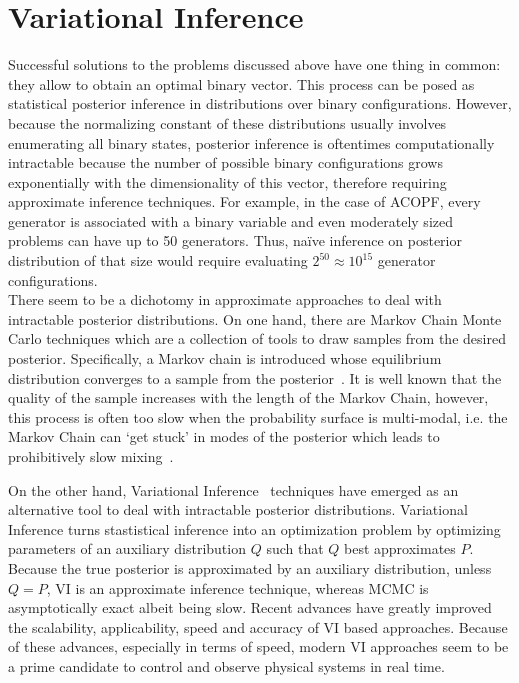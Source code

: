 \documentclass[11pt]{cmuthesis} %
\begin{document}
\chapter{Variational Inference}
Successful solutions to the problems discussed above have one thing in common: they allow to obtain an optimal binary vector. This process can be posed as statistical posterior inference in distributions over binary configurations. However, because the normalizing constant of these distributions usually involves enumerating all binary states, posterior inference is oftentimes computationally intractable because the number of possible binary configurations grows exponentially with the dimensionality of this vector, therefore requiring approximate inference techniques. For example, in the case of ACOPF, every generator is associated with a binary variable and even moderately sized problems can have up to 50 generators. Thus, na\"ive inference on posterior distribution of that size would require evaluating $2^{50} \approx 10^{15}$ generator configurations.\\
There seem to be a dichotomy in approximate approaches to deal with intractable posterior distributions. On one hand, there are Markov Chain Monte Carlo techniques which are a collection of tools to draw samples from the desired posterior. Specifically, a Markov chain is introduced whose equilibrium distribution converges to a sample from the posterior~\cite{geman1987stochastic}. It is well known that the quality of the sample increases with the length of the Markov Chain, however, this process is often too slow when the probability surface is multi-modal, i.e. the Markov Chain can `get stuck' in modes of the posterior which leads to prohibitively slow mixing~\cite{geyer1992practical}. 

On the other hand, Variational Inference~\cite{wainwright2008graphical} techniques have emerged as an alternative tool to deal with intractable posterior distributions. Variational Inference turns stastistical inference into an optimization problem by optimizing parameters of an auxiliary distribution $Q$ such that $Q$ best approximates $P$. Because the true posterior is approximated by an auxiliary distribution, unless $Q=P$, VI is an approximate inference technique, whereas MCMC is asymptotically exact albeit being slow. Recent advances have greatly improved the scalability, applicability, speed and accuracy of VI based approaches. Because of these advances, especially in terms of speed, modern VI approaches seem to be a prime candidate to control and observe physical systems in real time.
\end{document}
